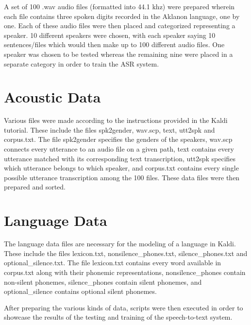 A set of 100 .wav audio files (formatted into 44.1 khz) were prepared wherein each file contains three spoken digits recorded in the Aklanon language, one by one. Each of these audio files were then placed and categorized representing a speaker. 10 different speakers were chosen, with each speaker saying 10 sentences/files which would then make up to 100 different audio files. One speaker was chosen to be tested whereas the remaining nine were placed in a separate category in order to train the ASR system.

\section{Acoustic Data}

Various files were made according to the instructions provided in the Kaldi tutorial. These include the files spk2gender, wav.scp, text, utt2spk and corpus.txt. The file spk2gender specifies the genders of the speakers, wav.scp connects every utterance to an audio file on a given path, text contains every utterance matched with its corresponding text transcription, utt2spk specifies which utterance belongs to which speaker, and corpus.txt contains every single possible utterance transcription among the 100 files. These data files were then prepared and sorted.

\section{Language Data}

The language data files are necessary for the modeling of a language in Kaldi. These include the files lexicon.txt, nonsilence\_phones.txt, silence\_phones.txt and optional\_silence.txt. The file lexicon.txt contains every word available in corpus.txt along with their phonemic representations, nonsilence\_phones contain non-silent phonemes, silence\_phones contain silent phonemes, and optional\_silence contains optional silent phonemes.

After preparing the various kinds of data, scripts were then executed in order to showcase the results of the testing and training of the speech-to-text system.



